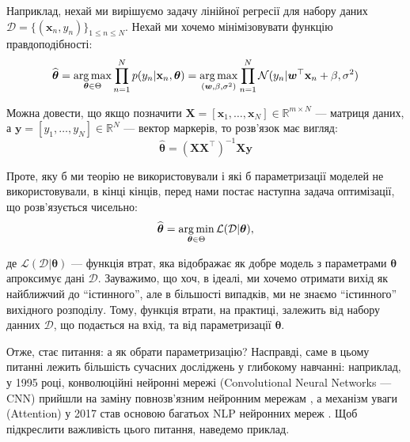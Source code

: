 \begin{example}
	Наприклад, нехай ми вирішуємо задачу лінійної регресії для набору даних
	$\mathcal{D} = \{(\mathbf{x}_n, y_n)\}_{1 \leq n \leq N}$. Нехай ми хочемо 
	мінімізовувати функцію правдоподібності:
	\begin{equation}
		\widehat{\boldsymbol{\theta}} = \operatorname*{arg\,max}_{\boldsymbol{\theta} \in \Theta} \prod_{n=1}^N p(y_n|\mathbf{x}_n,\boldsymbol{\theta}) = \operatorname*{arg\,max}_{(\boldsymbol{w},\beta,\sigma^2)}\prod_{n=1}^N \mathcal{N}(y_n|\boldsymbol{w}^{\top}\mathbf{x}_n+\beta,\sigma^2)
	\end{equation}

	Можна довести, що якщо позначити $\mathbf{X} = [\mathbf{x}_1,\dots,\mathbf{x}_N] \in \mathbb{R}^{m \times N}$ --- матриця даних, а $\mathbf{y} = [y_1,\dots,y_N] \in \mathbb{R}^N$ --- вектор маркерів, то розв'язок має вигляд:
	\begin{equation}
		\widehat{\boldsymbol{\theta}} = (\mathbf{X}\mathbf{X}^{\top})^{-1}\mathbf{X}\mathbf{y}
	\end{equation}
\end{example}

Проте, яку б ми теорію не використовували і які б параметризації моделей не
використовували, в кінці кінців, перед нами постає наступна задача оптимізації, що
розв'язується чисельно:
\begin{equation}
	\widehat{\boldsymbol{\theta}} = \operatorname*{arg\,min}_{\boldsymbol{\theta} \in \Theta} \mathcal{L}(\mathcal{D}|\boldsymbol{\theta}),
\end{equation}

де $\mathcal{L}(\mathcal{D}|\boldsymbol{\theta})$ --- функція втрат, яка
відображає як добре модель з параметрами $\boldsymbol{\theta}$ апроксимує дані
$\mathcal{D}$. Зауважимо, що хоч, в ідеалі, ми хочемо отримати вихід як
найближчий до ``істинного'', але в більшості випадків, ми не знаємо
``істинного'' вихідного розподілу. Тому, функція втрати, на практиці, 
залежить від набору данних $\mathcal{D}$, що подається на вхід, та від
параметризації $\boldsymbol{\theta}$.

Отже, стає питання: а як обрати параметризацію? Насправді, саме в цьому питанні
лежить більшість сучасних досліджень у глибокому навчанні: наприклад, у 1995
році, конволюційні нейронні мережі (Convolutional Neural Networks --- CNN)
прийшли на заміну повнозв'язним нейронним мережам \cite{lecun}, а механізм уваги
(Attention) у 2017 став основою багатьох NLP нейронних мереж \cite{attention}.
Щоб підкреслити важливість цього питання, наведемо приклад.

